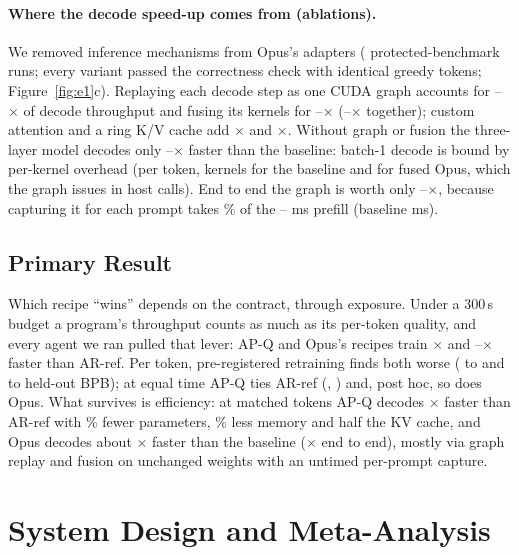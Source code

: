 \documentclass{article}
\newif\ifshowhumanmarkers \showhumanmarkersfalse
\newcommand{\humantag}[1]{{\color{humanframe}\sffamily\scriptsize\bfseries HUMAN AUTHOR MUST REWRITE/VERIFY [#1]}\ }
\newcommand{\humanauthor}[2][]{\ifshowhumanmarkers\begin{humanbox}\humantag{#1}#2\end{humanbox}\else #2\par\fi}
\begin{document}
\paragraph{Where the decode speed-up comes from (ablations).} We removed inference mechanisms from Opus's adapters (\CRIARuns{} protected-benchmark runs; every variant passed the correctness check with identical greedy tokens; Figure~\ref{fig:e1}c). Replaying each decode step as one CUDA graph accounts for \CRIAGraphLo--\CRIAGraphHi$\times$ of decode throughput and fusing its kernels \citep{ansel2024pytorch2} for \CRIAFusionLo--\CRIAFusionHi$\times$ (\CRIAJointLo--\CRIAJointHi$\times$ together); custom attention and a ring K/V cache add \CRIAAttnLo$\times$ and \CRIARingLo$\times$. Without graph or fusion the three-layer model decodes only \CRIAArchLo--\CRIAArchHi$\times$ faster than the baseline: batch-1 decode is bound by per-kernel overhead (per token, \CRIAKernBase{} kernels for the baseline and \CRIAKernFused{} for fused Opus, which the graph issues in \CRIALaunchGraph{} host calls). End to end the graph is worth only \CRIAGraphEtoELo--\CRIAGraphEtoEHi$\times$, because capturing it for each prompt takes \CRIACapture\% of the \CRIAPrefillLo--\CRIAPrefillHi{} ms prefill (baseline \CRIAPrefillBase{} ms).

\subsection{Primary Result}
Which recipe ``wins'' depends on the contract, through exposure. Under a 300\,s budget a program's throughput counts as much as its per-token quality, and every agent we ran pulled that lever: AP-Q and Opus's recipes train \CREOneRho$\times$ and \CRMTRhoLo--\CRMTRhoHi$\times$ faster than AR-ref. Per token, pre-registered retraining finds both worse (\CREOneMatchedLo{} to \CREOneMatchedHi{} and \CRMTDLo{} to \CRMTDHi{} held-out BPB); at equal time AP-Q ties AR-ref (\CREOneTimeHeldThree, \CREOneTimeHeldCI) and, post hoc, so does Opus. What survives is efficiency: at matched tokens AP-Q decodes \CRDecodeRatio$\times$ faster than AR-ref with \CRParamReduction\% fewer parameters, \CRMemoryReduction\% less memory and half the KV cache, and Opus decodes about \CRIATotalMed$\times$ faster than the baseline (\CRIAEtoEMed$\times$ end to end), mostly via graph replay and fusion on unchanged weights with an untimed per-prompt capture.
\label{partoneend}

\clearpage
\section{System Design and Meta-Analysis}\label{parttwo}
\end{document}
